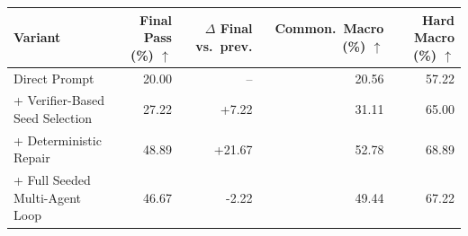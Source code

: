 \begin{tabular}{@{}lrrrr@{}}
\toprule
Variant & Final Pass (\%) $\uparrow$ & $\Delta$ Final vs.\ prev. & Common.\ Macro (\%) $\uparrow$ & Hard Macro (\%) $\uparrow$ \\
\midrule
Direct Prompt & 20.00 & -- & 20.56 & 57.22 \\
+ Verifier-Based Seed Selection & 27.22 & +7.22 & 31.11 & 65.00 \\
+ Deterministic Repair & 48.89 & +21.67 & 52.78 & 68.89 \\
+ Full Seeded Multi-Agent Loop & 46.67 & -2.22 & 49.44 & 67.22 \\
\bottomrule
\end{tabular}

